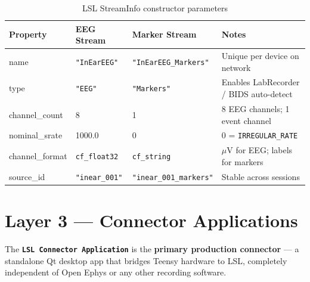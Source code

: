 \documentclass[11pt,a4paper]{article}
\newcommand{\component}[1]{\texttt{\textbf{#1}}}
\begin{document}
\begin{table}[H]
\centering
\caption{LSL StreamInfo constructor parameters}
\label{tab:lsl-streaminfo}
\begin{tabularx}{\textwidth}{l l l X}
\toprule
\textbf{Property} & \textbf{EEG Stream} & \textbf{Marker Stream} & \textbf{Notes} \\
\midrule
name            & \texttt{"InEarEEG"}           & \texttt{"InEarEEG\_Markers"} & Unique per device on network \\
type            & \texttt{"EEG"}                & \texttt{"Markers"}           & Enables LabRecorder / BIDS auto-detect \\
channel\_count  & 8                             & 1                            & 8 EEG channels; 1 event channel \\
nominal\_srate  & 1000.0                        & 0                            & 0 = \texttt{IRREGULAR\_RATE} \\
channel\_format & \texttt{cf\_float32}          & \texttt{cf\_string}          & $\mu$V for EEG; labels for markers \\
source\_id      & \texttt{"inear\_001"}         & \texttt{"inear\_001\_markers"} & Stable across sessions \\
\bottomrule
\end{tabularx}
\end{table}

\section{Layer 3 — Connector Applications}
\label{sec:connector}

The \component{LSL Connector Application} is the \textbf{primary production
connector} — a standalone Qt desktop app that bridges Teensy hardware to
LSL, completely independent of Open Ephys or any other recording software.
\end{document}
